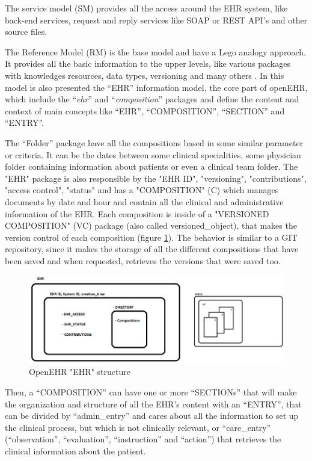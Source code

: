 \documentclass[mim_thesis.tex]{subfiles}
\begin{document}
The service model (SM) provides all the access around the EHR system, like back-end services, request and reply services like \ac{SOAP} or \ac{REST} \ac{API}’s and other source files.
	
The Reference Model (RM) is the base model and have a Lego\texttrademark{ } analogy approach. It provides all the basic information to the upper levels, like various packages with knowledges resources, data types, versioning and many others \citep{bacelar2015openehr}. In this model is also presented the “EHR” information model, the core part of openEHR, which include the “\textit{ehr}” and “\textit{composition}” packages and define the content and context of main concepts like “EHR”, “COMPOSITION”, “SECTION” and “ENTRY”.

The “Folder” package have all the compositions based in some similar parameter or criteria. It can be the dates between some clinical specialities, some physician folder containing information about patients or even a clinical team folder. The "EHR" package is also responsible by the "EHR ID", "versioning", "contributions", "access control", "status" and has a "COMPOSITION" (C) which manages documents by date and hour and contain all the clinical and administrative information of the EHR. Each composition is inside of a "VERSIONED COMPOSITION" (VC) package (also called versioned\_object), that makes the version control of each composition (figure \ref{fig:openehr_structure}). The behavior is similar to a GIT repository, since it makes the storage of all the different compositions that have been saved and when requested, retrieves the versions that were saved too.


\begin{figure}[H]
	\centering
    \includegraphics[width=1.1\textwidth]{img/openehr_structure.PNG}
	\caption{OpenEHR "EHR" structure}
	\label{fig:openehr_structure}
\end{figure}

Then, a “COMPOSITION” can have one or more “SECTIONs” that will make the organization and structure of all the EHR’s content with an “ENTRY”, that can be divided by “admin\_entry” and cares about all the information to set up the clinical process, but which is not clinically relevant, or “care\_entry” (“observation”, “evaluation”, “instruction” and “action”) that retrieves the clinical information about the patient.
\end{document}
